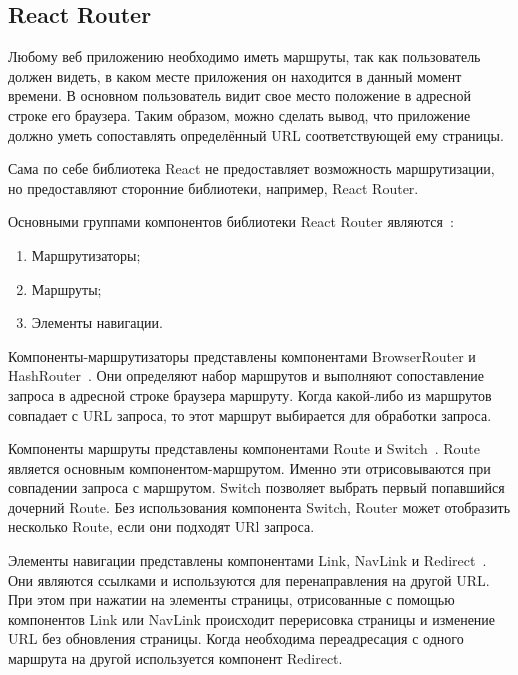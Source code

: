 \subsection{React Router}

Любому веб приложению необходимо иметь маршруты, так как пользователь должен видеть, в каком месте приложения он находится в данный момент времени. В основном пользователь видит свое место положение в адресной строке его браузера. Таким образом, можно сделать вывод, что приложение должно уметь сопоставлять определённый URL соответствующей ему страницы.

Сама по себе библиотека React не предоставляет возможность маршрутизации, но предоставляют сторонние библиотеки, например, React Router.

Основными группами компонентов библиотеки React Router являются~\cite{react-router}:

\begin{enumerate}
  \item Маршрутизаторы;
  \item Маршруты;
  \item Элементы навигации.
\end{enumerate}

Компоненты-маршрутизаторы представлены компонентами BrowserRouter и HashRouter~\cite{react-router}. Они определяют набор маршрутов и выполняют сопоставление запроса в адресной строке браузера маршруту. Когда какой-либо из маршрутов совпадает с URL запроса, то этот маршрут выбирается для обработки запроса.

Компоненты маршруты представлены компонентами Route и Switch~\cite{react-router}. Route является основным компонентом-маршрутом. Именно эти отрисовываются при совпадении запроса с маршрутом. Switch позволяет выбрать первый попавшийся дочерний Route. Без использования компонента Switch, Router может отобразить несколько Route, если они подходят URl запроса.

Элементы навигации представлены компонентами Link, NavLink и Redirect~\cite{react-router}. Они являются ссылками и используются для перенаправления на другой URL. При этом при нажатии на элементы страницы, отрисованные с помощью компонентов Link или NavLink происходит перерисовка страницы и изменение URL без обновления страницы. Когда необходима переадресация с одного маршрута на другой используется компонент Redirect.
